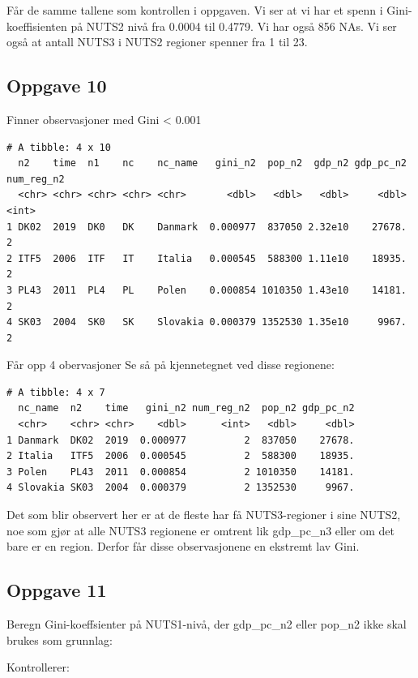 \documentclass[
  a4paper,
]{article}
\begin{document}
Får de samme tallene som kontrollen i oppgaven. Vi ser at vi har et
spenn i Gini-koeffisienten på NUTS2 nivå fra 0.0004 til 0.4779. Vi har
også 856 NAs. Vi ser også at antall NUTS3 i NUTS2 regioner spenner fra 1
til 23.

\subsection{Oppgave 10}\label{oppgave-10}

Finner observasjoner med Gini \textless{} 0.001

\begin{verbatim}
# A tibble: 4 x 10
  n2    time  n1    nc    nc_name   gini_n2  pop_n2  gdp_n2 gdp_pc_n2 num_reg_n2
  <chr> <chr> <chr> <chr> <chr>       <dbl>   <dbl>   <dbl>     <dbl>      <int>
1 DK02  2019  DK0   DK    Danmark  0.000977  837050 2.32e10    27678.          2
2 ITF5  2006  ITF   IT    Italia   0.000545  588300 1.11e10    18935.          2
3 PL43  2011  PL4   PL    Polen    0.000854 1010350 1.43e10    14181.          2
4 SK03  2004  SK0   SK    Slovakia 0.000379 1352530 1.35e10     9967.          2
\end{verbatim}

Får opp 4 obervasjoner Se så på kjennetegnet ved disse regionene:

\begin{verbatim}
# A tibble: 4 x 7
  nc_name  n2    time   gini_n2 num_reg_n2  pop_n2 gdp_pc_n2
  <chr>    <chr> <chr>    <dbl>      <int>   <dbl>     <dbl>
1 Danmark  DK02  2019  0.000977          2  837050    27678.
2 Italia   ITF5  2006  0.000545          2  588300    18935.
3 Polen    PL43  2011  0.000854          2 1010350    14181.
4 Slovakia SK03  2004  0.000379          2 1352530     9967.
\end{verbatim}

Det som blir observert her er at de fleste har få NUTS3-regioner i sine
NUTS2, noe som gjør at alle NUTS3 regionene er omtrent lik gdp\_pc\_n3
eller om det bare er en region. Derfor får disse observasjonene en
ekstremt lav Gini.

\subsection{Oppgave 11}\label{oppgave-11}

Beregn Gini-koeffsienter på NUTS1-nivå, der gdp\_pc\_n2 eller pop\_n2
ikke skal brukes som grunnlag:

Kontrollerer:
\end{document}
